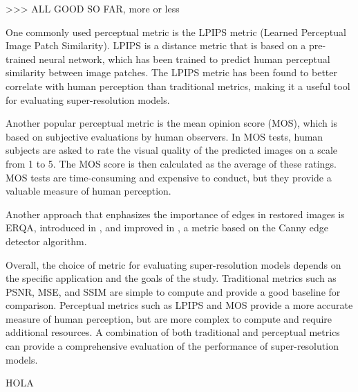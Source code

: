 >>> ALL GOOD SO FAR, more or less

One commonly used perceptual metric is the LPIPS metric (Learned Perceptual Image Patch Similarity). LPIPS is a distance metric that is based on a pre-trained neural network, which has been trained to predict human perceptual similarity between image patches. The LPIPS metric has been found to better correlate with human perception than traditional metrics, making it a useful tool for evaluating super-resolution models.

Another popular perceptual metric is the mean opinion score (MOS), which is based on subjective evaluations by human observers. In MOS tests, human subjects are asked to rate the visual quality of the predicted images on a scale from 1 to 5. The MOS score is then calculated as the average of these ratings. MOS tests are time-consuming and expensive to conduct, but they provide a valuable measure of human perception.

Another approach that enphasizes the importance of edges in restored images is ERQA, introduced in \cite{kirillova2021erqa}, and improved in \cite{lyapustin2022towards}, a metric based on the Canny edge detector algorithm.

Overall, the choice of metric for evaluating super-resolution models depends on the specific application and the goals of the study. Traditional metrics such as PSNR, MSE, and SSIM are simple to compute and provide a good baseline for comparison. Perceptual metrics such as LPIPS and MOS provide a more accurate measure of human perception, but are more complex to compute and require additional resources. A combination of both traditional and perceptual metrics can provide a comprehensive evaluation of the performance of super-resolution models.

HOLA

